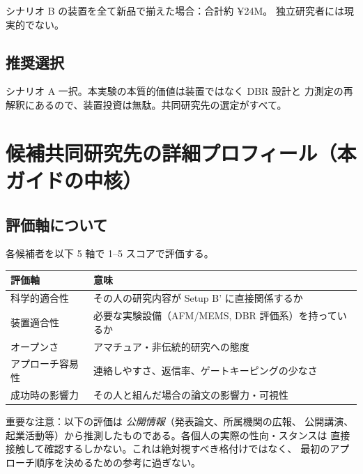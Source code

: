 \documentclass[11pt,a4paper]{article}
\def\textbf#1{#1}%
\begin{document}
シナリオ B の装置を全て新品で揃えた場合：\textbf{合計約 ¥24M}。
独立研究者には現実的でない。

\subsection{推奨選択}

\textbf{シナリオ A 一択}。本実験の本質的価値は装置ではなく DBR 設計と
力測定の再解釈にあるので、装置投資は無駄。共同研究先の選定がすべて。

\newpage

\section{候補共同研究先の詳細プロフィール（本ガイドの中核）}

\subsection{評価軸について}

各候補者を以下 5 軸で 1--5 スコアで評価する。

\begin{center}
\begin{tabular}{p{}p{}}
\toprule
評価軸 & 意味 \\
\midrule
\textbf{科学的適合性} & その人の研究内容が Setup B' に直接関係するか \\
\textbf{装置適合性} & 必要な実験設備（AFM/MEMS, DBR 評価系）を持っているか \\
\textbf{オープンさ} & アマチュア・非伝統的研究への態度 \\
\textbf{アプローチ容易性} & 連絡しやすさ、返信率、ゲートキーピングの少なさ \\
\textbf{成功時の影響力} & その人と組んだ場合の論文の影響力・可視性 \\
\bottomrule
\end{tabular}
\end{center}

\textbf{重要な注意}：以下の評価は \emph{公開情報}（発表論文、所属機関の広報、
公開講演、起業活動等）から推測したものである。各個人の実際の性向・スタンスは
直接接触して確認するしかない。\textbf{これは絶対視すべき格付けではなく、
最初のアプローチ順序を決めるための参考に過ぎない}。

\vspace{1em}
\end{document}
